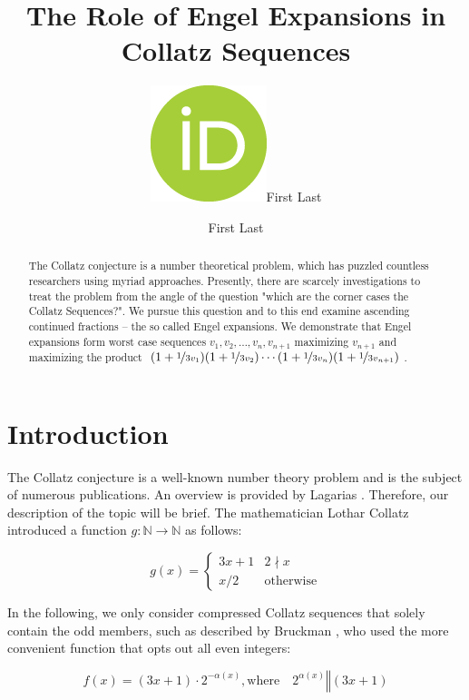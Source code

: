 \documentclass[12pt]{amsart}
\title[Engel Expansions in Collatz Sequences]{The Role of Engel Expansions in Collatz Sequences}
\author[F.\ Last1]{\href{https://orcid.org/0000-0000-0000-0000}{\includegraphics[scale=0.06]{orcid.png}}\hspace{1mm}First Last}
\author[F.\ Last2]{First Last}
\theoremstyle{definition}
\begin{document}
	
\begingroup
\let\MakeUppercase\relax
\maketitle
\endgroup

\begin{abstract}
The Collatz conjecture is a number theoretical problem, which has puzzled countless researchers using myriad approaches. Presently, there are scarcely investigations to treat the problem from the angle of the question "which are the corner cases the Collatz Sequences?". We pursue this question and to this end examine ascending continued fractions -- the so called Engel expansions. We demonstrate that Engel expansions form worst case sequences $v_1,v_2,\ldots,v_n,v_{n+1}$ maximizing $v_{n+1}$ and maximizing the product $(1+\nicefrac{1}{3v_1})(1+\nicefrac{1}{3v_2})\cdots(1+\nicefrac{1}{3v_n})(1+\nicefrac{1}{3v_{n+1}})$.
\end{abstract}

\section{Introduction}
\label{introduction}
The Collatz conjecture is a well-known number theory problem and is the subject of numerous publications. An overview is provided by Lagarias \cite{Ref_Lagarias_2010}. Therefore, our description of the topic will be brief. The mathematician Lothar Collatz introduced a function $g:\mathbb{N}\rightarrow\mathbb{N}$ as follows:

\begin{equation}
\label{eq:func_collatz}
g(x)=
\begin{cases}
3x+1	&	2\nmid x\\
x/2		&	\text{otherwise}
\end{cases}
\end{equation}

\par\medskip
In the following, we only consider compressed Collatz sequences that solely contain the odd members, such as described by Bruckman \cite{Ref_Bruckman_2008}, who used the more convenient function that opts out all even integers:

\begin{equation}
\label{eq:func_collatz_odd}
f(x)=(3x+1)\cdot2^{-\alpha(x)},\text{where}\hspace{1em}2^{\alpha(x)}\mathrel\Vert(3x+1)
\end{equation}
\end{document}
